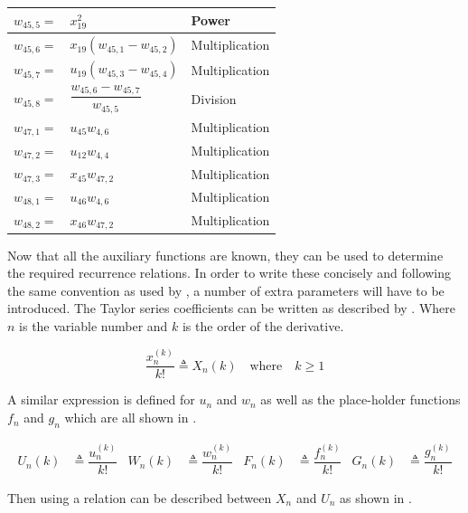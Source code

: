 \begin{longtable}{|p{1.5cm}|l|p{2cm}|}
$w_{45,5}=$ & $ x_{19}^{2} $ & Power \\ \hline 
$w_{45,6}=$ & $ x_{19}\left(w_{45,1}-w_{45,2}\right) $ & Multiplication \\ \hline 
$w_{45,7}=$ & $ u_{19}\left(w_{45,3}-w_{45,4}\right) $ & Multiplication \\ \hline 
$w_{45,8}=$ & $ \dfrac{w_{45,6}-w_{45,7}}{w_{45,5}} $ & Division \\ \hline 
$w_{47,1}=$ & $ u_{45}w_{4,6} $ & Multiplication \\ \hline 
$w_{47,2}=$ & $ u_{12}w_{4,4} $ & Multiplication \\ \hline 
$w_{47,3}=$ & $ x_{45}w_{47,2} $ & Multiplication \\ \hline 
$w_{48,1}=$ & $ u_{46}w_{4,6} $ & Multiplication \\ \hline 
$w_{48,2}=$ & $ x_{46}w_{47,2} $ & Multiplication \\ \hline 

\end{longtable}

Now that all the auxiliary functions are known, they can be used to determine the required recurrence relations. In order to write these concisely and following the same convention as used by \cite{scott2008high}, a number of extra parameters will have to be introduced. The Taylor series coefficients can be written as described by . Where $n$ is the variable number and $k$ is the order of the derivative.

\begin{equation} \label{eq:tsCoeff}
\dfrac{x_{n}^{\left(k\right)}}{k!} \triangleq X_{n}\left(k\right) \quad \text{where} \quad k \geq 1
\end{equation}

A similar expression is defined for $u_{n}$ and $w_{n}$ as well as the place-holder functions $f_{n}$ and $g_{n}$ which are all shown in .

\begin{align} \label{eq:redDer}
U_{n}\left(k\right)& \triangleq \dfrac{u_{n}^{\left(k\right)}}{k!}
&
W_{n}\left(k\right)& \triangleq \dfrac{w_{n}^{\left(k\right)}}{k!}
&
F_{n}\left(k\right)& \triangleq \dfrac{f_{n}^{\left(k\right)}}{k!}
&
G_{n}\left(k\right)& \triangleq \dfrac{g_{n}^{\left(k\right)}}{k!}
\end{align}



Then using  a relation can be described between $X_{n}$ and $U_{n}$ as shown in  \citep{scott2008high}. 

